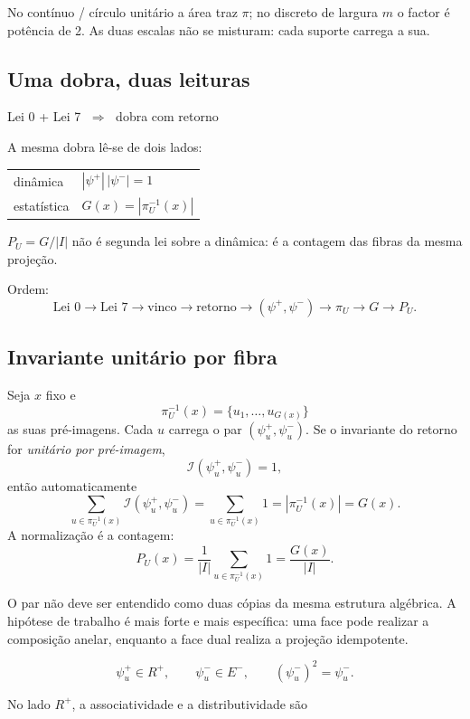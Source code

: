 \documentclass[11pt,a4paper]{article}
\begin{document}
No contínuo / círculo unitário a área traz $\pi$; no discreto de largura $m$ o factor
é potência de 2. As duas escalas não se misturam: cada suporte carrega a sua.

\subsection{Uma dobra, duas leituras}

\begin{center}
Lei 0 + Lei 7 $\;\Longrightarrow\;$ dobra com retorno
\end{center}
A mesma dobra lê-se de dois lados:
\begin{center}
\renewcommand{\arraystretch}{1.25}
\begin{tabular}{@{}ll@{}}
dinâmica & $|\psi^+|\,|\psi^-|=1$ \\
estatística & $G(x)=|\pi_U^{-1}(x)|$ \\
\end{tabular}
\end{center}
$P_U=G/|I|$ não é segunda lei sobre a dinâmica: é a contagem das fibras da mesma projeção.

Ordem:
\[
\text{Lei 0}\to\text{Lei 7}\to\text{vinco}\to\text{retorno}
\to(\psi^+,\psi^-)\to\pi_U\to G\to P_U.
\]

\subsection{Invariante unitário por fibra}

Seja $x$ fixo e
\[
\pi_U^{-1}(x)=\{u_1,\ldots,u_{G(x)}\}
\]
as suas pré-imagens. Cada $u$ carrega o par $(\psi_u^+,\psi_u^-)$. Se o invariante do retorno
for \emph{unitário por pré-imagem},
\[
\boxed{\mathcal I(\psi_u^+,\psi_u^-)=1},
\]
então automaticamente
\[
\sum_{u\in\pi_U^{-1}(x)}\mathcal I(\psi_u^+,\psi_u^-)
=\sum_{u\in\pi_U^{-1}(x)}1
=|\pi_U^{-1}(x)|
=G(x).
\]
A normalização é a contagem:
\[
\boxed{P_U(x)=\frac1{|I|}\sum_{u\in\pi_U^{-1}(x)}1=\frac{G(x)}{|I|}.}
\]

O par não deve ser entendido como duas cópias da mesma estrutura algébrica.
A hipótese de trabalho é mais forte e mais específica: uma face pode realizar
a composição anelar, enquanto a face dual realiza a projeção idempotente.

$$
\boxed{
\psi_u^+\in R^+,\qquad
\psi_u^-\in E^-,
\qquad
(\psi_u^-)^2=\psi_u^-.
}
$$

No lado \(R^+\), a associatividade e a distributividade são
\end{document}
